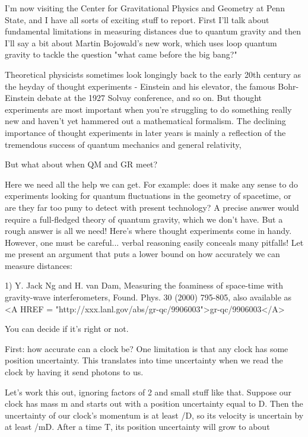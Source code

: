 


I'm now visiting the Center for Gravitational Physics and Geometry at
Penn State, and I have all sorts of exciting stuff to report.  First 
I'll talk about fundamental limitations in measuring distances due 
to quantum gravity and then I'll say a bit about Martin Bojowald's 
new work, which uses loop quantum gravity to tackle the question 
"what came before the big bang?"

Theoretical physicists sometimes look longingly back to the early 20th
century as the heyday of thought experiments - Einstein and his
elevator, the famous Bohr-Einstein debate at the 1927 Solvay
conference, and so on.  But thought experiments are most important
when you're struggling to do something really new and haven't yet
hammered out a mathematical formalism.  The declining importance of
thought experiments in later years is mainly a reflection of the
tremendous success of quantum mechanics and general relativity,

But what about when QM and GR meet?

Here we need all the help we can get.  For example: does it make any
sense to do experiments looking for quantum fluctuations in the
geometry of spacetime, or are they far too puny to detect with present
technology?  A precise answer would require a full-fledged theory of
quantum gravity, which we don't have.  But a rough answer is all we
need!  Here's where thought experiments come in handy.  However, one
must be careful...  verbal reasoning easily conceals many pitfalls!
Let me present an argument that puts a lower bound on how accurately
we can measure distances:

1) Y. Jack Ng and H. van Dam, Measuring the foaminess of space-time
with gravity-wave interferometers, Found. Phys. 30 (2000) 795-805,
also available as <A HREF = "http://xxx.lanl.gov/abs/gr-qc/9906003">gr-qc/9906003</A>

You can decide if it's right or not.   

First: how accurate can a clock be?  One limitation is that any clock
has some position uncertainty.  This translates into time uncertainty
when we read the clock by having it send photons to us.

Let's work this out, ignoring factors of 2 and small stuff like that.
Suppose our clock has mass m and starts out with a position
uncertainty equal to D.  Then the uncertainty of our clock's momentum
is at least \hbar /D, so its velocity is uncertain by at least \hbar /mD.
After a time T, its position uncertainty will grow to about

